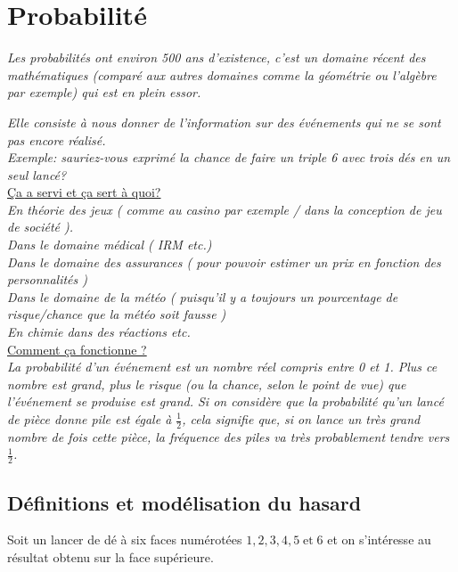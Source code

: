 \documentclass[french]{book}
\begin{document}
\chapter{Probabilité}

\textit{Les probabilités ont environ 500 ans d'existence, c'est un domaine récent des mathématiques (comparé aux autres domaines comme la géométrie ou l'algèbre par exemple) qui est en plein essor.}

\textit{Elle consiste à nous donner de l'information sur des événements qui ne se sont pas encore réalisé.}\\ 

\textit{Exemple: sauriez-vous exprimé la chance de faire un triple 6 avec trois dés en un seul lancé?}\\


\underline{Ça a servi et ça sert à quoi? }\\

\textit{En théorie des jeux ( comme au casino par exemple / dans la conception de jeu de société ). \\
Dans le domaine médical ( IRM etc.)\\ 
Dans le domaine des assurances ( pour pouvoir estimer un prix en fonction des personnalités )\\
Dans le domaine de la météo ( puisqu’il y a toujours un pourcentage de risque/chance que la météo soit fausse )\\
En chimie dans des réactions etc.}\\

\underline{Comment ça fonctionne ? }\\

\textit{La probabilité d'un événement est un nombre réel compris entre 0 et 1. Plus ce nombre est grand, plus le risque (ou la chance, selon le point de vue) que l'événement se produise est grand. Si on considère que la probabilité qu'un lancé de pièce donne pile est égale à $\frac{1}{2}$, cela signifie que, si on lance un très grand nombre de fois cette pièce, la fréquence des piles va très probablement tendre vers $\frac{1}{2}$.} 

\section{Définitions et modélisation du hasard}

Soit un lancer de dé à six faces numérotées $1,2,3,4,5 \; \textrm{et} \; 6$ et on s'intéresse au résultat obtenu sur la face supérieure.
\end{document}

